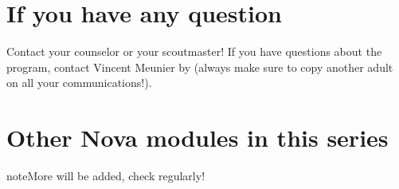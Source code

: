 \documentclass[letterpaper,10pt,english,openany,oneside]{sphinxmanual}
\begin{document}
\section{If you have any question}
\label{\detokenize{introduction:if-you-have-any-question}}
Contact your counselor or your scoutmaster! If you have questions about the program, contact Vincent Meunier  by  (always make sure to copy another adult on all your communications!).


\section{Other Nova modules in this series}
\label{\detokenize{introduction:other-nova-modules-in-this-series}}
\begin{sphinxadmonition}{note}{More will be added, check regularly!}



\end{sphinxadmonition}
\end{document}
